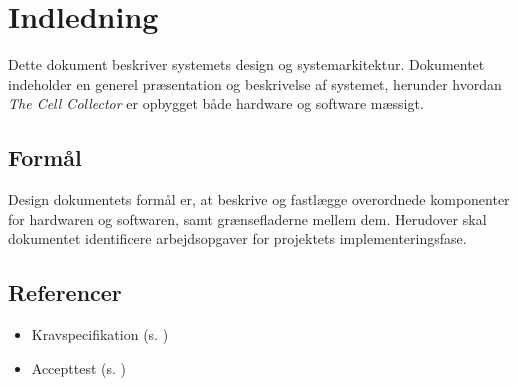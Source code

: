 \section{Indledning}
Dette dokument beskriver systemets design og systemarkitektur. Dokumentet indeholder en generel præsentation og beskrivelse af systemet, herunder hvordan \textit{The Cell Collector} er opbygget både hardware og software mæssigt.


\subsection{Formål}
Design dokumentets formål er, at beskrive og fastlægge overordnede komponenter for hardwaren og softwaren, samt grænsefladerne mellem dem.  
Herudover skal dokumentet identificere arbejdsopgaver for projektets implementeringsfase. 

\subsection{Referencer}
\begin{itemize}
\item Kravspecifikation (s. \pageref{ch:ks})
\item Accepttest (s. \pageref{ch:at})
\end{itemize}
